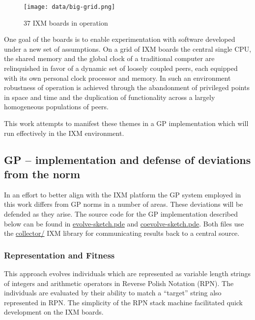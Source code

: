 \documentclass[11pt]{article}
\begin{document}
\begin{figure}[htb]
\centering
\texttt{[image: data/big-grid.png]}
\caption{37 IXM boards in operation}
\end{figure}

One goal of the boards is to enable experimentation with software
developed under a new set of assumptions.  On a grid of IXM boards the
central single CPU, the shared memory and the global clock of a
traditional computer are relinquished in favor of a dynamic set of
loosely coupled peers, each equipped with its own personal clock
processor and memory.  In such an environment robustness of operation
is achieved through the abandonment of privileged points in space and
time and the duplication of functionality across a largely homogeneous
populations of peers.

This work attempts to manifest these themes in a GP implementation
which will run effectively in the IXM environment.

\subsection*{GP -- implementation and defense of deviations from the norm}
\label{sec-1.3}

In an effort to better align with the IXM platform the GP system
employed in this work differs from GP norms in a number of areas.
These deviations will be defended as they arise.  The source code for
the GP implementation described below can be found in
\href{file:///nfs/adaptive/eschulte/src/gp4ixm-report/src/evolve-sketch.pde}{evolve-sketch.pde} and \href{file:///nfs/adaptive/eschulte/src/gp4ixm-report/src/coevolve-sketch.pde}{coevolve-sketch.pde}.  Both files use the
\href{file:///nfs/adaptive/eschulte/src/gp4ixm-report/src/collector/}{collector/} IXM library for communicating results back to a central
source.

\subsubsection*{Representation and Fitness}
\label{sec-1.3.1}

This approach evolves individuals which are represented as variable
length strings of integers and arithmetic operators in Reverse Polish
Notation (RPN).  The individuals are evaluated by their ability to
match a ``target'' string also represented in RPN.  The simplicity of
the RPN stack machine facilitated quick development on the IXM boards.
\end{document}
